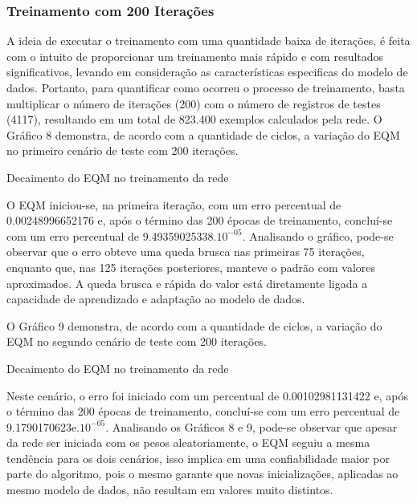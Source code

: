 \subsubsection{Treinamento com 200 Iterações}	
A ideia de executar o treinamento com uma quantidade baixa de iterações, é feita com o intuito de proporcionar um treinamento mais rápido e com resultados significativos, levando em consideração as características especificas do modelo de dados. Portanto, para quantificar como ocorreu o processo de treinamento, basta multiplicar o número de iterações (200) com o número de registros de testes (4117), resultando em um total de 823.400 exemplos calculados pela rede. O Gráfico 8 demonstra, de acordo com a quantidade de ciclos, a variação do EQM no primeiro cenário de teste com 200 iterações.
\begin{grafico}[h]
	\centering
	\caption{Decaimento do EQM no treinamento da rede}
	\label{lingua}
\end{grafico}

O EQM iniciou-se, na primeira iteração, com um erro percentual de 0.00248996652176 e, após o término das 200 épocas de treinamento, concluí-se com um erro percentual de 9.49359025338.$10^{-05}$. Analisando o gráfico, pode-se observar que o erro obteve uma queda brusca nas primeiras 75 iterações, enquanto que, nas 125 iterações posteriores, manteve o padrão com valores aproximados. A queda brusca e rápida do valor está diretamente ligada a capacidade de aprendizado e adaptação ao modelo de dados.

O Gráfico 9 demonstra, de acordo com a quantidade de ciclos, a variação do EQM no segundo cenário de teste com 200 iterações.
\begin{grafico}[h]
	\centering
	\caption{Decaimento do EQM no treinamento da rede}
	\label{lingua}
\end{grafico}

Neste cenário, o erro foi iniciado com um percentual de 0.00102981131422 e, após o término das 200 épocas de treinamento, concluí-se com um erro percentual de 9.1790170623e.$10^{-05}$. Analisando os Gráficos 8 e 9, pode-se observar que apesar da rede ser iniciada com os pesos aleatoriamente, o EQM seguiu a mesma tendência para os dois cenários, isso implica em uma confiabilidade maior por parte do algoritmo, pois o mesmo garante que novas inicializações, aplicadas ao mesmo modelo de dados, não resultam em valores muito distintos.

